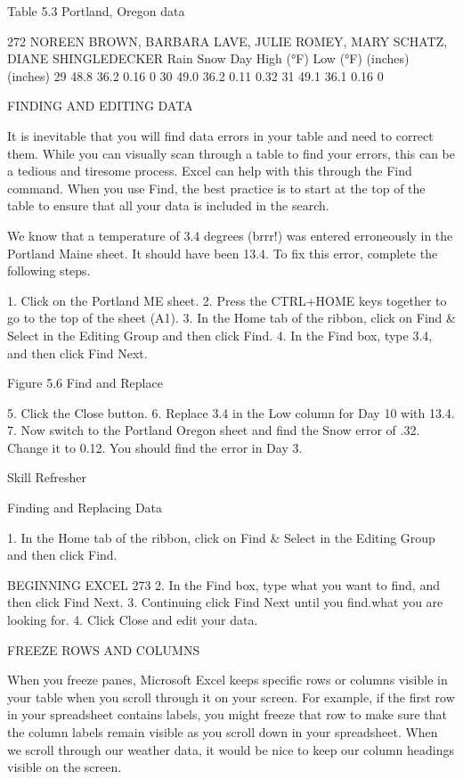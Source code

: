 Table 5.3 Portland, Oregon data


272 NOREEN BROWN, BARBARA LAVE, JULIE ROMEY, MARY SCHATZ, DIANE SHINGLEDECKER
Rain     Snow
Day High (°F) Low (°F)
(inches) (inches)
29      48.8       36.2       0.16     0
30      49.0       36.2       0.11     0.32
31      49.1       36.1       0.16     0


FINDING AND EDITING DATA

It is inevitable that you will find data errors in your table and need to correct them. While you can
visually scan through a table to find your errors, this can be a tedious and tiresome process. Excel can
help with this through the Find command. When you use Find, the best practice is to start at the top
of the table to ensure that all your data is included in the search.

We know that a temperature of 3.4 degrees (brrr!) was entered erroneously in the Portland Maine
sheet. It should have been 13.4. To fix this error, complete the following steps.

1.    Click on the Portland ME sheet.
2.    Press the CTRL+HOME keys together to go to the top of the sheet (A1).
3.    In the Home tab of the ribbon, click on Find & Select in the Editing Group and then click Find.
4.    In the Find box, type 3.4, and then click Find Next.




Figure 5.6 Find and Replace


5. Click the Close button.
6. Replace 3.4 in the Low column for Day 10 with 13.4.
7. Now switch to the Portland Oregon sheet and find the Snow error of .32. Change it to 0.12. You
should find the error in Day 3.


Skill Refresher


Finding and Replacing Data

1. In the Home tab of the ribbon, click on Find & Select in the Editing Group and then click Find.



BEGINNING EXCEL 273
2. In the Find box, type what you want to find, and then click Find Next.
3. Continuing click Find Next until you find.what you are looking for.
4. Click Close and edit your data.




FREEZE ROWS AND COLUMNS

When you freeze panes, Microsoft Excel keeps specific rows or columns visible in your table when
you scroll through it on your screen. For example, if the first row in your spreadsheet contains labels,
you might freeze that row to make sure that the column labels remain visible as you scroll down in
your spreadsheet. When we scroll through our weather data, it would be nice to keep our column
headings visible on the screen.

